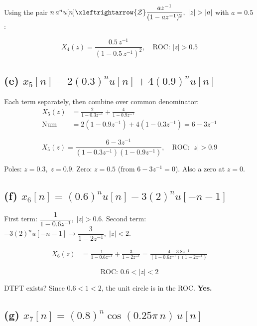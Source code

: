 \documentclass[11pt]{article}
\newcommand{\zt}{\xleftrightarrow{\mathcal{Z}}}
\begin{document}
Using the pair $n\,a^n u[n] \zt \dfrac{az^{-1}}{(1 - az^{-1})^2},\; |z|>|a|$ with $a=0.5$:

\begin{equation*}
\boxed{X_4(z) = \frac{0.5\,z^{-1}}{(1 - 0.5\,z^{-1})^2}, \quad \text{ROC: } |z| > 0.5}
\end{equation*}

\subsection*{(e) $x_5[n] = 2(0.3)^n u[n] + 4(0.9)^n u[n]$}

Each term separately, then combine over common denominator:
\begin{align*}
X_5(z) &= \frac{2}{1 - 0.3z^{-1}} + \frac{4}{1 - 0.9z^{-1}} \\[6pt]
\text{Num} &= 2(1 - 0.9z^{-1}) + 4(1 - 0.3z^{-1}) = 6 - 3z^{-1}
\end{align*}

\begin{equation*}
\boxed{X_5(z) = \frac{6 - 3z^{-1}}{(1 - 0.3z^{-1})(1 - 0.9z^{-1})}, \quad \text{ROC: } |z| > 0.9}
\end{equation*}

Poles: $z = 0.3,\; z = 0.9$. \quad Zero: $z = 0.5$ (from $6 - 3z^{-1} = 0$). Also a zero at $z = 0$.

\subsection*{(f) $x_6[n] = (0.6)^n u[n] - 3(2)^n u[-n-1]$}

First term: $\dfrac{1}{1 - 0.6z^{-1}},\; |z|>0.6$. \quad Second term: $-3(2)^n u[-n-1] \to \dfrac{3}{1 - 2z^{-1}},\; |z|<2$.

\begin{align*}
X_6(z) &= \frac{1}{1 - 0.6z^{-1}} + \frac{3}{1 - 2z^{-1}} = \frac{4 - 3.8z^{-1}}{(1 - 0.6z^{-1})(1 - 2z^{-1})}
\end{align*}

\begin{equation*}
\boxed{\text{ROC: } 0.6 < |z| < 2}
\end{equation*}

DTFT exists? Since $0.6 < 1 < 2$, the unit circle is in the ROC. \textbf{Yes.}

\subsection*{(g) $x_7[n] = (0.8)^n \cos(0.25\pi\,n)\,u[n]$}
\end{document}
